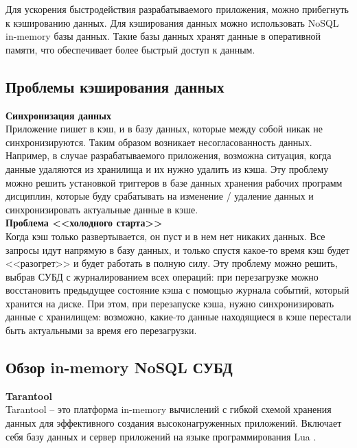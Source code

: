 Для ускорения быстродействия разрабатываемого приложения, можно прибегнуть к кэшированию данных. Для кэширования данных можно  использовать NoSQL \cite{nosql} in-memory базы данных. Такие базы данных хранят данные в оперативной памяти, что обеспечивает более быстрый доступ к данным.

\subsection{Проблемы кэширования данных}

\noindent\textbf{Синхронизация данных}\\

Приложение пишет в кэш, и в базу данных, которые между собой никак не синхронизируются. Таким образом возникает несогласованность данных. Например, в случае разрабатываемого приложения, возможна ситуация, когда данные удаляются из хранилища и их нужно удалить из
кэша. Эту проблему можно решить установкой триггеров в базе данных хранения рабочих программ дисциплин, которые буду срабатывать на изменение / удаление данных и синхронизировать актуальные данные в кэше.\\

\noindent\textbf{Проблема <<холодного старта>>}\\

Когда кэш только развертывается, он пуст и в нем нет никаких данных. Все запросы идут напрямую в базу данных, и только спустя какое-то время кэш будет <<разогрет>> и будет работать в полную силу. Эту проблему можно решить, выбрав СУБД с журналированием всех операций: при перезагрузке можно восстановить предыдущее состояние кэша с помощью журнала событий, который хранится на диске. При этом, при перезапуске кэша, нужно синхронизировать данные с хранилищем: возможно, какие-то данные находящиеся в кэше перестали быть актуальными за время его перезагрузки.

\subsection{Обзор in-memory NoSQL СУБД}

\noindent\textbf{Tarantool}\\

Tarantool \cite{tarantool} -- это платформа in-memory вычислений с гибкой схемой хранения данных для эффективного создания высоконагруженных приложений. Включает себя базу данных и сервер приложений на языке программирования Lua \cite{lua}.


